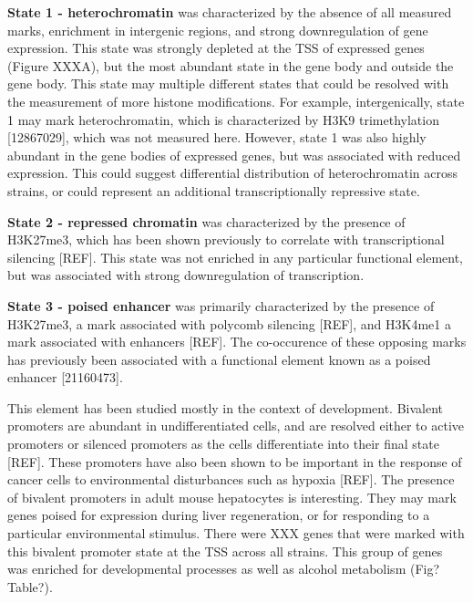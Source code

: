 \documentclass[10pt,letterpaper]{article}
\begin{document}
\textbf{State 1 - heterochromatin} was characterized by the absence of
all measured marks, enrichment in intergenic regions, and strong
downregulation of gene expression. This state was strongly depleted at
the TSS of expressed genes (Figure XXXA), but the most abundant state in
the gene body and outside the gene body. This state may multiple
different states that could be resolved with the measurement of more
histone modifications. For example, intergenically, state 1 may mark
heterochromatin, which is characterized by H3K9 trimethylation
{[}12867029{]}, which was not measured here. However, state 1 was also
highly abundant in the gene bodies of expressed genes, but was
associated with reduced expression. This could suggest differential
distribution of heterochromatin across strains, or could represent an
additional transcriptionally repressive state.

\textbf{State 2 - repressed chromatin} was characterized by the presence
of H3K27me3, which has been shown previously to correlate with
transcriptional silencing {[}REF{]}. This state was not enriched in any
particular functional element, but was associated with strong
downregulation of transcription.

\textbf{State 3 - poised enhancer} was primarily characterized by the
presence of H3K27me3, a mark associated with polycomb silencing
{[}REF{]}, and H3K4me1 a mark associated with enhancers {[}REF{]}. The
co-occurence of these opposing marks has previously been associated with
a functional element known as a poised enhancer {[}21160473{]}.

This element has been studied mostly in the context of development.
Bivalent promoters are abundant in undifferentiated cells, and are
resolved either to active promoters or silenced promoters as the cells
differentiate into their final state {[}REF{]}. These promoters have
also been shown to be important in the response of cancer cells to
environmental disturbances such as hypoxia {[}REF{]}. The presence of
bivalent promoters in adult mouse hepatocytes is interesting. They may
mark genes poised for expression during liver regeneration, or for
responding to a particular environmental stimulus. There were XXX genes
that were marked with this bivalent promoter state at the TSS across all
strains. This group of genes was enriched for developmental processes as
well as alcohol metabolism (Fig? Table?).
\end{document}

